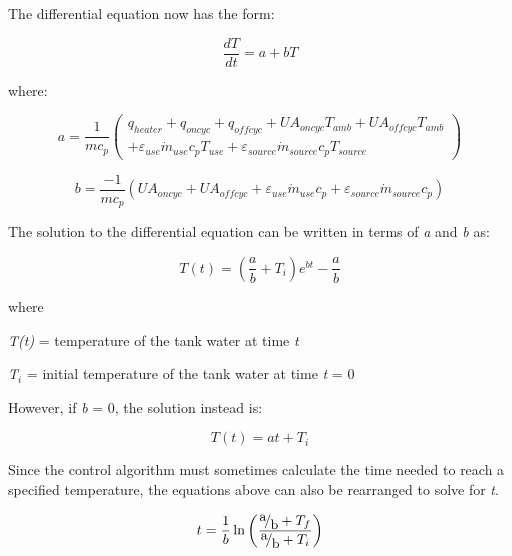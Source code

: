 The differential equation now has the form:

\begin{equation}
\frac{{dT}}{{dt}} = a + bT
\end{equation}

where:

\begin{equation}
a = \frac{1}{{m{c_p}}}\left( \begin{array}{l}{q_{heater}} + {q_{oncyc}} + {q_{offcyc}} + U{A_{oncyc}}{T_{amb}} + U{A_{offcyc}}{T_{amb}}\\ + {\varepsilon_{use}}{{\dot m}_{use}}{c_p}{T_{use}} + {\varepsilon_{source}}{{\dot m}_{source}}{c_p}{T_{source}}\end{array} \right)
\end{equation}

\begin{equation}
b = \frac{{ - 1}}{{m{c_p}}}\left( {U{A_{oncyc}} + U{A_{offcyc}} + {\varepsilon_{use}}{{\dot m}_{use}}{c_p} + {\varepsilon_{source}}{{\dot m}_{source}}{c_p}} \right)
\end{equation}

The solution to the differential equation can be written in terms of \emph{a} and \emph{b} as:

\begin{equation}
T\left( t \right) = \left( {\frac{a}{b} + {T_i}} \right){e^{bt}} - \frac{a}{b}
\end{equation}

where

\emph{T(t)} = temperature of the tank water at time \emph{t}

\emph{T\(_{i}\)} = initial temperature of the tank water at time \emph{t} = 0

However, if \emph{b} = 0, the solution instead is:

\begin{equation}
T\left( t \right) = at + {T_i}
\end{equation}

Since the control algorithm must sometimes calculate the time needed to reach a specified temperature, the equations above can also be rearranged to solve for \emph{t}.

\begin{equation}
t = \frac{1}{b}\ln \left( {\frac{{{\raise0.7ex\hbox{a} \!\mathord{\left/ {\vphantom {a b}}\right.}\!\lower0.7ex\hbox{b}} + {T_f}}}{{{\raise0.7ex\hbox{a} \!\mathord{\left/ {\vphantom {a b}}\right.}\!\lower0.7ex\hbox{b}} + {T_i}}}} \right)
\end{equation}

